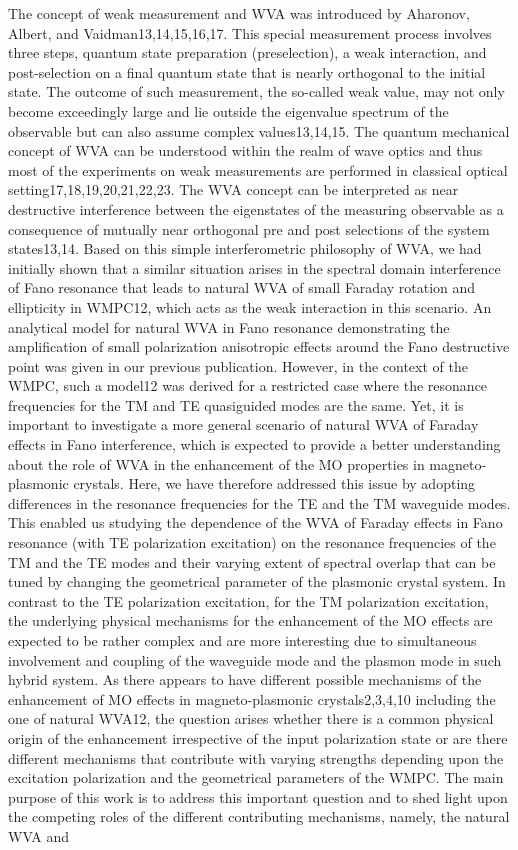 \documentclass[13pt]{article}
\begin{document}
\par
	The concept of weak measurement and WVA was introduced by Aharonov, Albert, and Vaidman13,14,15,16,17. This special measurement process involves three steps, quantum state preparation (preselection), a weak interaction, and post-selection on a final quantum state that is nearly orthogonal to the initial state. The outcome of such measurement, the so-called weak value, may not only become exceedingly large and lie outside the eigenvalue spectrum of the observable but can also assume complex values13,14,15. The quantum mechanical concept of WVA can be understood within the realm of wave optics and thus most of the experiments on weak measurements are performed in classical optical setting17,18,19,20,21,22,23. The WVA concept can be interpreted as near destructive interference between the eigenstates of the measuring observable as a consequence of mutually near orthogonal pre and post selections of the system states13,14. Based on this simple interferometric philosophy of WVA, we had initially shown that a similar situation arises in the spectral domain interference of Fano resonance that leads to natural WVA of small Faraday rotation and ellipticity in WMPC12, which acts as the weak interaction in this scenario. An analytical model for natural WVA in Fano resonance demonstrating the amplification of small polarization anisotropic effects around the Fano destructive point was given in our previous publication. However, in the context of the WMPC, such a model12 was derived for a restricted case where the resonance frequencies for the TM and TE quasiguided modes are the same. Yet, it is important to investigate a more general scenario of natural WVA of Faraday effects in Fano interference, which is expected to provide a better understanding about the role of WVA in the enhancement of the MO properties in magneto-plasmonic crystals. Here, we have therefore addressed this issue by adopting differences in the resonance frequencies for the TE and the TM waveguide modes. This enabled us studying the dependence of the WVA of Faraday effects in Fano resonance (with TE polarization excitation) on the resonance frequencies of the TM and the TE modes and their varying extent of spectral overlap that can be tuned by changing the geometrical parameter of the plasmonic crystal system. In contrast to the TE polarization excitation, for the TM polarization excitation, the underlying physical mechanisms for the enhancement of the MO effects are expected to be rather complex and are more interesting due to simultaneous involvement and coupling of the waveguide mode and the plasmon mode in such hybrid system. As there appears to have different possible mechanisms of the enhancement of MO effects in magneto-plasmonic crystals2,3,4,10 including the one of natural WVA12, the question arises whether there is a common physical origin of the enhancement irrespective of the input polarization state or are there different mechanisms that contribute with varying strengths depending upon the excitation polarization and the geometrical parameters of the WMPC. The main purpose of this work is to address this important question and to shed light upon the competing roles of the different contributing mechanisms, namely, the natural WVA and 
\end{document}
